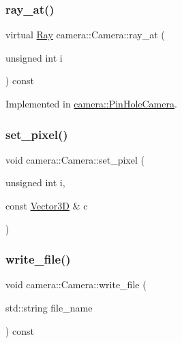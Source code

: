 \mbox{\label{classcamera_1_1Camera_adf751a32f3b3b9ea5df48affafc39732}} 
\subsubsection{\texorpdfstring{ray\_at()}{ray\_at()}}
{\footnotesize\ttfamily virtual \mbox{\hyperlink{classRay}{Ray}} camera\+::\+Camera\+::ray\+\_\+at (\begin{DoxyParamCaption}\item[{unsigned int}]{i }\end{DoxyParamCaption}) const\hspace{0.3cm}{\ttfamily [pure virtual]}}



Implemented in \mbox{\hyperlink{classcamera_1_1PinHoleCamera_ab2457caa55561521cab10490e67ba8c8}{camera\+::\+Pin\+Hole\+Camera}}.

\mbox{\label{classcamera_1_1Camera_aa6152a7c756850336a977d21a4462c6f}} 
\subsubsection{\texorpdfstring{set\_pixel()}{set\_pixel()}}
{\footnotesize\ttfamily void camera\+::\+Camera\+::set\+\_\+pixel (\begin{DoxyParamCaption}\item[{unsigned int}]{i,  }\item[{const \mbox{\hyperlink{classVector3D}{Vector3D}} \&}]{c }\end{DoxyParamCaption})}

\mbox{\label{classcamera_1_1Camera_ab437e0cd4a3f5206002d870ecc2bd8e0}} 
\subsubsection{\texorpdfstring{write\_file()}{write\_file()}}
{\footnotesize\ttfamily void camera\+::\+Camera\+::write\+\_\+file (\begin{DoxyParamCaption}\item[{std\+::string}]{file\+\_\+name }\end{DoxyParamCaption}) const}



